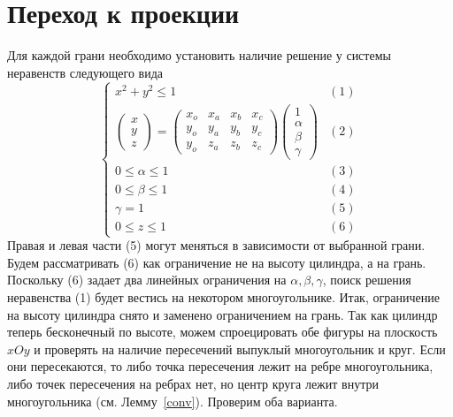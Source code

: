 \documentclass[pdftex,ptm,12pt,a4paper]{report}
\begin{document}
\section{Переход к проекции}
    Для каждой грани необходимо установить наличие решение у системы неравенств следующего вида
    \begin{equation}\label{proj}
      \begin{cases}
        x^2 + y^2 \le 1 & (1)\\
        \begin{pmatrix} x \\ y \\ z \end{pmatrix}
        =
        \begin{pmatrix} x_o & x_a & x_b & x_c \\ y_o & y_a & y_b & y_c  \\ y_o & z_a & z_b & z_c
        \end{pmatrix} \begin {pmatrix} 1 \\ \alpha \\ \beta \\ \gamma \end{pmatrix} & (2)\\
        0 \le  \alpha   \le  1 & (3)\\
        0 \le  \beta   \le  1 & (4)\\
        \gamma   =  1 & (5) \\
        0 \le z \le 1 & (6)
      \end{cases}
    \end{equation}
  Правая и левая части (5) могут меняться в зависимости от выбранной грани.
  Будем рассматривать (6) как ограничение не на высоту цилиндра, а на грань.
  Поскольку (6) задает два линейных ограничения на $\alpha, \beta, \gamma$, поиск решения неравенства (1) будет вестись на некотором многоугольнике.
  Итак, ограничение на высоту цилиндра снято и заменено ограничением на грань.
  Так как цилиндр теперь бесконечный по высоте, можем спроецировать обе фигуры на плоскость $xOy$ и проверять на наличие пересечений выпуклый многоугольник и круг.
  Если они пересекаются, то либо точка пересечения лежит на ребре многоугольника, либо точек пересечения на ребрах нет, но центр круга лежит внутри многоугольника (см. Лемму~\ref{conv}).
  Проверим оба варианта.
\end{document}
